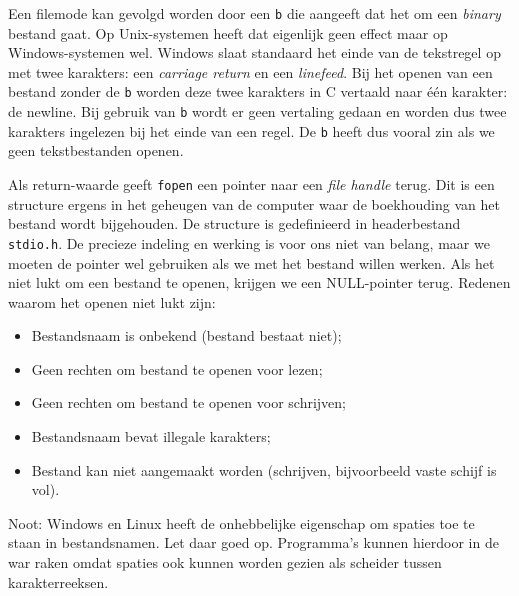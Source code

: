 Een filemode kan gevolgd worden door een \texttt{b} die aangeeft dat het om een \textsl{binary} bestand gaat. Op Unix-systemen heeft dat eigenlijk geen effect maar op Windows-systemen wel. Windows slaat standaard het einde van de tekstregel op met twee karakters: een \textsl{carriage return} en een \textsl{linefeed}. Bij het openen van een bestand zonder de \texttt{b} worden deze twee karakters in C vertaald naar één karakter: de newline. Bij gebruik van \texttt{b} wordt er geen vertaling gedaan en worden dus twee karakters ingelezen bij het einde van een regel. De \texttt{b} heeft dus vooral zin als we geen tekstbestanden openen.

Als return-waarde geeft \texttt{fopen} een pointer naar een \textsl{file handle} terug. Dit is een structure ergens in het geheugen van de computer waar de boekhouding van het bestand wordt bijgehouden. De structure is gedefinieerd in headerbestand \texttt{stdio.h}. De precieze indeling en werking is voor ons niet van belang, maar we moeten de pointer wel gebruiken als we met het bestand willen werken. Als het niet lukt om een bestand te openen, krijgen we een NULL-pointer terug. Redenen waarom het openen niet lukt zijn: 

\begin{itemize}
\item Bestandsnaam is onbekend (bestand bestaat niet);
\item Geen rechten om bestand te openen voor lezen;
\item Geen rechten om bestand te openen voor schrijven;
\item Bestandsnaam bevat illegale karakters;
\item Bestand kan niet aangemaakt worden (schrijven, bijvoorbeeld vaste schijf is vol).
\end{itemize}

Noot: Windows en Linux heeft de onhebbelijke eigenschap om spaties toe te staan in bestandsnamen. Let daar goed op. Programma's kunnen hierdoor in de war raken omdat spaties ook kunnen worden gezien als scheider tussen karakterreeksen.

